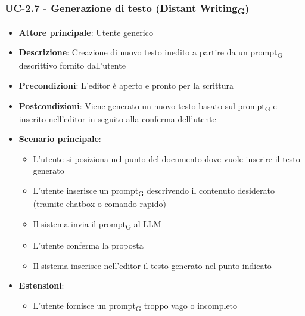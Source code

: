 \documentclass[11pt,a4paper]{article}
\newcommand{\gls}[1]{#1\textsubscript{G}}
\begin{document}
\subsubsection{UC-2.7 - Generazione di testo (\gls{Distant Writing})}
\begin{itemize}
    \item \textbf{Attore principale}: Utente generico
    \item \textbf{Descrizione}: Creazione di nuovo testo inedito a partire da un \gls{prompt} descrittivo fornito dall’utente
    \item \textbf{Precondizioni}: L’editor è aperto e pronto per la scrittura
    \item \textbf{Postcondizioni}: Viene generato un nuovo testo basato sul \gls{prompt} e inserito nell’editor in seguito alla conferma dell'utente
    \item \textbf{Scenario principale}:
    \begin{itemize}
        \item L’utente si posiziona nel punto del documento dove vuole inserire il testo generato
        \item L’utente inserisce un \gls{prompt} descrivendo il contenuto desiderato (tramite chatbox o comando rapido)
        \item Il sistema invia il \gls{prompt} al LLM
        \item L'utente conferma la proposta
        \item Il sistema inserisce nell'editor il testo generato nel punto indicato
    \end{itemize}
    \item \textbf{Estensioni}:
    \begin{itemize}
        \item L’utente fornisce un \gls{prompt} troppo vago o incompleto
    \end{itemize}
\end{itemize}
\end{document}
